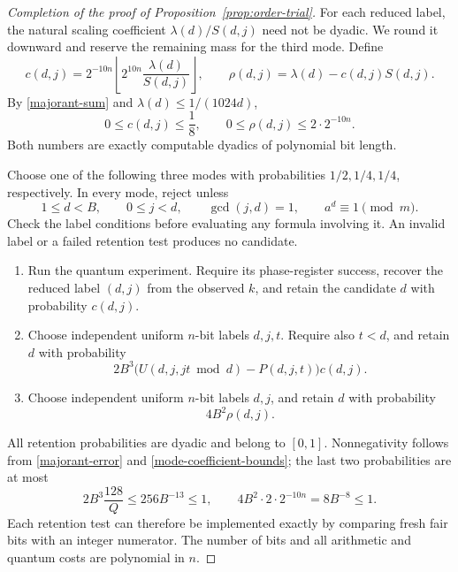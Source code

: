 \begin{proof}[Completion of the proof of Proposition~\ref{prop:order-trial}]
For each reduced label, the natural scaling coefficient
\(\lambda(d)/S(d,j)\) need not be dyadic. We round it downward and reserve
the remaining mass for the third mode. Define
\begin{equation}\label{mode-coefficient}
 c(d,j)=2^{-10n}
   \left\lfloor 2^{10n}\frac{\lambda(d)}{S(d,j)}\right\rfloor,
 \qquad
 \rho(d,j)=\lambda(d)-c(d,j)S(d,j).
\end{equation}
By \eqref{majorant-sum} and \(\lambda(d)\le1/(1024d)\),
\begin{equation}\label{mode-coefficient-bounds}
 0\le c(d,j)\le\frac18,\qquad
 0\le\rho(d,j)\le2\cdot2^{-10n}.
\end{equation}
Both numbers are exactly computable dyadics of polynomial bit length.

Choose one of the following three modes with probabilities \(1/2,1/4,1/4\),
respectively.  In every mode, reject unless
\[
 1\le d<B,\qquad 0\le j<d,\qquad \gcd(j,d)=1,
 \qquad a^d\equiv1\pmod m.
\]
Check the label conditions before evaluating any formula involving it.
An invalid label or a failed retention test produces no candidate.
\begin{enumerate}
 \item Run the quantum experiment.  Require its phase-register success,
 recover the reduced label \((d,j)\) from the observed \(k\), and retain
 the candidate \(d\) with probability \(c(d,j)\).
 \item Choose independent uniform \(n\)-bit labels \(d,j,t\).
 Require also \(t<d\), and retain \(d\) with probability
 \begin{equation}\label{mode-discrepancy}
  2B^3\bigl(U(d,j,jt\bmod d)-P(d,j,t)\bigr)c(d,j).
 \end{equation}
 \item Choose independent uniform \(n\)-bit labels \(d,j\), and retain
 \(d\) with probability
 \begin{equation}\label{mode-remainder}
  4B^2\rho(d,j).
 \end{equation}
\end{enumerate}
All retention probabilities are dyadic and belong to \([0,1]\).
Nonnegativity follows from \eqref{majorant-error} and
\eqref{mode-coefficient-bounds}; the last two probabilities are at most
\[
 2B^3\frac{128}{Q}\le256B^{-13}\le1,
 \qquad
 4B^2\cdot2\cdot2^{-10n}=8B^{-8}\le1.
\]
Each retention test can therefore be implemented exactly by comparing
fresh fair bits with an integer numerator.  The number of bits and all
arithmetic and quantum costs are polynomial in \(n\).


\end{proof}
